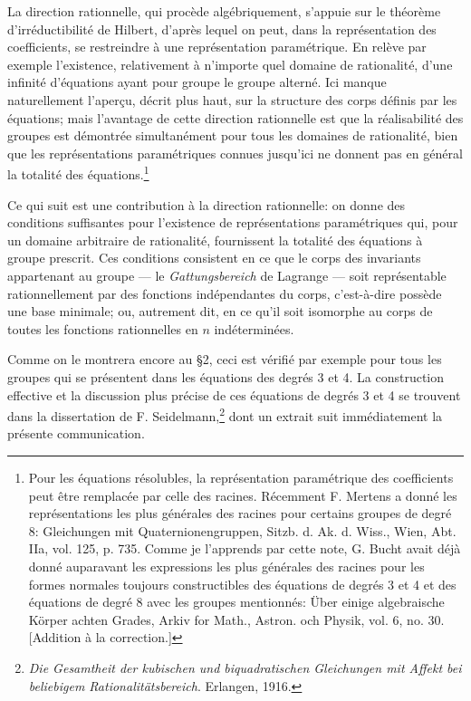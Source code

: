 La direction \og{}rationnelle\fg{}, qui procède algébriquement, s'appuie sur le théorème d'irréductibilité de Hilbert, d'après lequel on peut, dans la représentation des coefficients, se restreindre à une représentation paramétrique. En relève par exemple l'existence, relativement à n'importe quel domaine de rationalité, d'une infinité d'équations ayant pour groupe le groupe alterné. Ici manque naturellement l'aperçu, décrit plus haut, sur la structure des corps définis par les équations; mais l'avantage de cette direction \og{}rationnelle\fg{} est que la réalisabilité des groupes est démontrée simultanément pour tous les domaines de rationalité, bien que les représentations paramétriques connues jusqu'ici ne donnent pas en général la totalité des équations.\footnote{Pour les équations résolubles, la représentation paramétrique des coefficients peut être remplacée par celle des racines. Récemment F. Mertens a donné les représentations les plus générales des racines pour certains groupes de degré 8: \og{}Gleichungen mit Quaternionengruppen\fg{}, Sitzb. d. Ak. d. Wiss., Wien, Abt. IIa, vol. 125, p. 735. Comme je l'apprends par cette note, G. Bucht avait déjà donné auparavant les expressions les plus générales des racines pour les formes normales toujours constructibles des équations de degrés 3 et 4 et des équations de degré 8 avec les groupes mentionnés: \og{}Über einige algebraische Körper achten Grades\fg{}, Arkiv for Math., Astron. och Physik, vol. 6, no. 30. [Addition à la correction.]}

Ce qui suit est une contribution à la direction \og{}rationnelle\fg{}: on donne des conditions suffisantes pour l'existence de représentations paramétriques qui, pour un domaine arbitraire de rationalité, fournissent la totalité des équations à groupe prescrit. Ces conditions consistent en ce que le corps des invariants appartenant au groupe --- le \emph{Gattungsbereich} de Lagrange --- soit représentable rationnellement par des fonctions indépendantes du corps, c'est-à-dire possède une \og{}base minimale\fg{}; ou, autrement dit, en ce qu'il soit isomorphe au corps de toutes les fonctions rationnelles en $n$ indéterminées.

Comme on le montrera encore au \S 2, ceci est vérifié par exemple pour tous les groupes qui se présentent dans les équations des degrés 3 et 4. La construction effective et la discussion plus précise de ces équations de degrés 3 et 4 se trouvent dans la dissertation de F. Seidelmann,\footnote{\emph{Die Gesamtheit der kubischen und biquadratischen Gleichungen mit Affekt bei beliebigem Rationalitätsbereich}. Erlangen, 1916.} dont un extrait suit immédiatement la présente communication.

